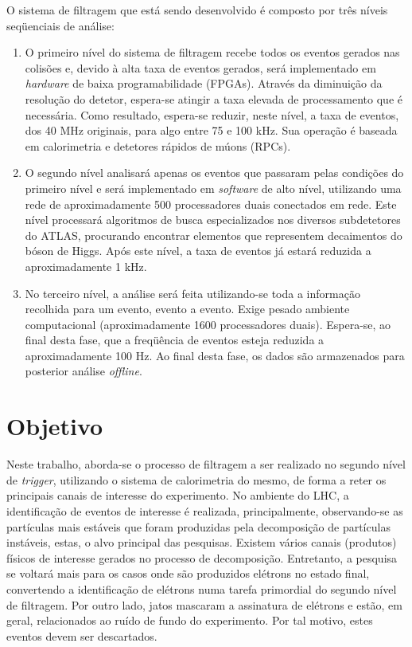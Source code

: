 O sistema de filtragem que está sendo desenvolvido é composto por três níveis seqüenciais de análise:

\begin{enumerate}

\item O primeiro nível do sistema de filtragem recebe todos os eventos gerados nas colisões e, devido à alta taxa de eventos gerados, será implementado em \emph{hardware} de baixa programabilidade (FPGAs). Através da diminuição da resolução do detetor, espera-se atingir a taxa elevada de processamento que é necessária. Como resultado, espera-se reduzir, neste nível, a taxa de eventos, dos 40 MHz originais, para algo entre 75 e 100 kHz. Sua operação é baseada em calorimetria e detetores rápidos de múons (RPCs).

\item O segundo nível analisará apenas os eventos que passaram pelas condições do primeiro nível e será implementado em \emph{software} de alto nível, utilizando uma rede de aproximadamente 500 processadores duais conectados em rede. Este nível processará algoritmos de busca especializados nos diversos subdetetores do ATLAS, procurando encontrar elementos que representem decaimentos do bóson de Higgs. Após este nível, a taxa de eventos já estará reduzida a aproximadamente 1 kHz.

\item No terceiro nível, a análise será feita utilizando-se toda a informação recolhida para um evento, evento a evento. Exige pesado ambiente computacional (aproximadamente 1600 processadores duais). Espera-se, ao final desta fase, que a freqüência de eventos esteja reduzida a aproximadamente 100 Hz. Ao final desta fase, os dados são armazenados para posterior análise \emph{offline}.

\end{enumerate}


\section{Objetivo}

Neste trabalho, aborda-se o processo de filtragem a ser realizado no segundo nível de \emph{trigger}, utilizando o sistema de calorimetria do mesmo, de forma a reter os principais canais de interesse do experimento. No ambiente do LHC, a identificação de eventos de interesse é realizada, principalmente, observando-se as partículas mais estáveis que foram produzidas pela decomposição de partículas instáveis, estas, o alvo principal das pesquisas. Existem vários canais (produtos) físicos de interesse gerados no processo de decomposição. Entretanto, a pesquisa se voltará mais para os casos onde são produzidos elétrons no estado final, convertendo a identificação de elétrons numa tarefa primordial do segundo nível de filtragem. Por outro lado, jatos mascaram a assinatura de elétrons e estão, em geral, relacionados ao ruído de fundo do experimento. Por tal motivo, estes eventos devem ser descartados.

